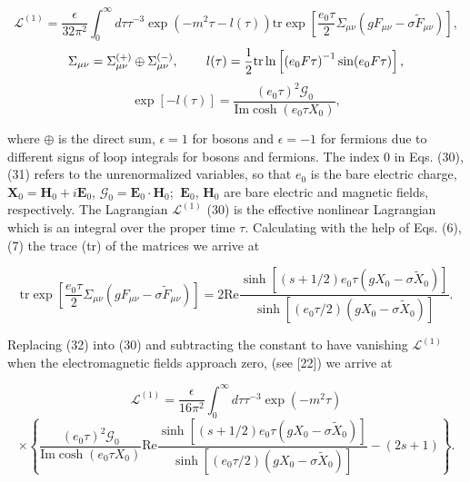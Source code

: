 \documentclass[a4paper,12pt]{article}
\begin{document}
\begin{equation}
\mathcal{L}^{(1)}=\frac \epsilon {32\pi ^2}\int_0^\infty d\tau
\tau ^{-3}\exp \left( -m^2\tau -l(\tau )\right) \mbox{tr}\exp
\left[ \frac{ e_0\tau }2\Sigma _{\mu \nu }\left( gF_{\mu \nu
}-\sigma \widetilde{F}_{\mu \nu }\right) \right],  \label{30}
\end{equation}
\[
\Sigma _{\mu \nu }=\Sigma _{\mu \nu }^{(+)}\oplus \Sigma _{\mu \nu
}^{(-)}, \hspace{0.3in}l(\tau )=\frac 12\mbox{tr}\ln \left[ \left(
e_0F\tau \right) ^{-1}\sin (e_0F\tau )\right],
\]
\vspace{-8mm}
\begin{equation}  \label{31}
\end{equation}
\vspace{-8mm}
\[
\exp \left[ -l(\tau )\right] =\frac{(e_0\tau
)^2\mathcal{G}_0}{\mbox{Im} \cosh (e_0\tau X_0)},
\]

where $\oplus $ is the direct sum, $\epsilon =1$ for bosons and
$\epsilon =-1 $ for fermions due to different signs of loop
integrals for bosons and fermions. The index $0$ in Eqs. (30),
(31) refers to the unrenormalized variables, so that $e_0$ is the
bare electric charge, $\mathbf{X}_0=\mathbf{ H }_0+i\mathbf{E}_0$,
$\mathcal{G}_0=\mathbf{E}_0\cdot \mathbf{H}_0$; $ \mathbf{\ E}_0$,
$\mathbf{H}_0$ are bare electric and magnetic fields,
respectively. The Lagrangian $\mathcal{L}^{(1)}$ (30) is the
effective nonlinear Lagrangian which is an integral over the
proper time $\tau $. Calculating with the help of Eqs. (6), (7)
the trace (tr) of the matrices we arrive at

\begin{equation}
\mbox{tr}\exp \left[ \frac{e_0\tau }2\Sigma _{\mu \nu }\left(
gF_{\mu \nu }-\sigma \widetilde{F}_{\mu \nu }\right) \right]
=2\mbox{Re}\frac{\sinh \left[ (s+1/2)e_0\tau \left( gX_0-\sigma
\widetilde{X}_0\right) \right] } {\sinh \left[ \left( e_0\tau
/2\right) \left( gX_0-\sigma \widetilde{X} _0\right) \right] }.
\label{32}
\end{equation}

Replacing (32) into (30) and subtracting the constant to have
vanishing $ \mathcal{L}^{(1)}$ when the electromagnetic fields
approach zero, (see [22]) we arrive at

\[
\mathcal{L}^{(1)}=\frac \epsilon {16\pi ^2}\int_0^\infty d\tau \tau
^{-3}\exp \left( -m^2\tau \right)
\]
\vspace{-8mm}
\begin{equation}  \label{33}
\end{equation}
\vspace{-8mm}
\[
\times \left\{ \frac{(e_0\tau )^2\mathcal{G}_0}{\mbox{Im}\cosh
(e_0\tau X_0)} \mbox{Re}\frac{\sinh \left[ (s+1/2)e_0\tau \left(
gX_0-\sigma \widetilde{X} _0\right) \right] }{\sinh \left[ \left(
e_0\tau /2\right) \left( gX_0-\sigma \widetilde{X}_0\right)
\right] }-\left( 2s+1\right) \right\}.
\]
\end{document}
